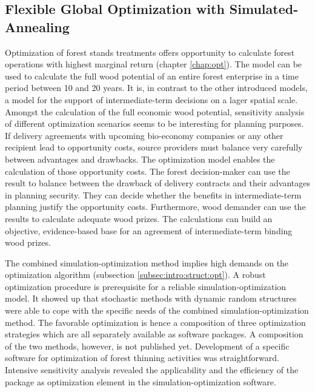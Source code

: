 \subsection{Flexible Global Optimization with Simulated-Annealing}
\label{subsec:discussion:struct:opt}
Optimization of forest stands treatments offers opportunity to calculate forest operations with highest marginal return (chapter \ref{chap:opt}). The model can be used to calculate the full wood potential of an entire forest enterprise in a time period between 10 and 20 years. It is, in contrast to the other introduced models, a model for the support of intermediate-term decisions on a lager spatial scale. Amongst the calculation of the full economic wood potential, sensitivity analysis of different optimization scenarios seems to be interesting for planning purposes. If delivery agreements with upcoming bio-economy companies or any other recipient lead to opportunity costs, source providers must balance very carefully between advantages and drawbacks. The optimization model enables the calculation of those opportunity costs. The forest decision-maker can use the result to balance between the drawback of delivery contracts and their advantages in planning security. They can decide whether the benefits in intermediate-term planning justify the opportunity costs. Furthermore, wood demander can use the results to calculate adequate wood prizes. The calculations can build an objective, evidence-based base for an agreement of intermediate-term binding wood prizes.

The combined simulation-optimization method implies high demands on the optimization algorithm (subsection \ref{subsec:intro:struct:opt}). A robust optimization procedure is prerequisite for a reliable simulation-optimization model. It showed up that stochastic methods with dynamic random structures were able to cope with the specific needs of the combined simulation-optimization method. The favorable optimization is hence a composition of three optimization strategies \citep{corana_1987, kirkpatrick_1983, pronzato_1984} which are all separately available as software packages. A composition of the two methods, however, is not published yet. Development of a specific software for optimization of forest thinning activities was straightforward. Intensive  sensitivity analysis revealed the applicability and the efficiency of the package as optimization element in the simulation-optimization software.

